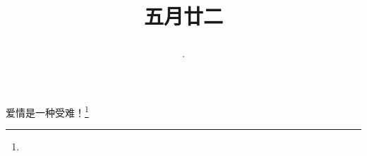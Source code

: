 \title{\date[d=27,m=6,y=2024][year:cn-y,年,month:cn,day:cn,日,·,weekday]·五月廿二 }
爱情是一种受难！\footnote{ }

